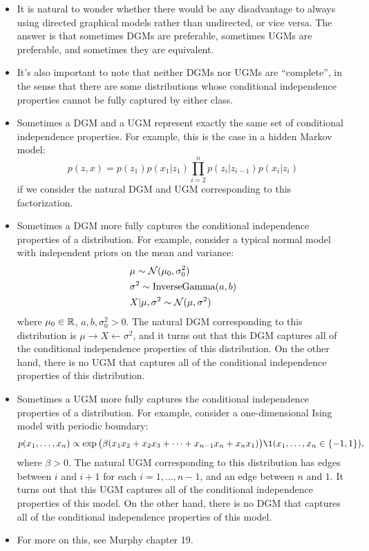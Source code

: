 \documentclass[12pt]{article}
\begin{document}
\begin{itemize}
\item It is natural to wonder whether there would be any disadvantage to always using directed graphical models rather than undirected, or vice versa. The answer is that sometimes DGMs are preferable, sometimes UGMs are preferable, and sometimes they are equivalent. 
\item It's also important to note that neither DGMs nor UGMs are ``complete'', in the sense that there are some distributions whose conditional independence properties cannot be fully captured by either class.
\item Sometimes a DGM and a UGM represent exactly the same set of conditional independence properties. For example, this is the case in a hidden Markov model:
$$ p(z,x) = p(z_1) p(x_1 | z_1) \prod_{i = 2}^n p(z_i | z_{i -1}) p(x_i | z_i) $$
if we consider the natural DGM and UGM corresponding to this factorization.
\item Sometimes a DGM more fully captures the conditional independence properties of a distribution. For example, consider a typical normal model with independent priors on the mean and variance:
\begin{align*}
&\mu \sim\mathcal{N}(\mu_0,\sigma_0^2)\\
& \sigma^2 \sim \mathrm{InverseGamma} (a,b)\\
& X | \mu,\sigma^2 \sim \mathcal{N}(\mu, \sigma^2)
\end{align*}
where $\mu_0 \in \mathbb{R}$, $a,b,\sigma_0^2>0$.
The natural DGM corresponding to this distribution is $\mu\rightarrow X \leftarrow \sigma^2$, and it turns out that this DGM captures all of the conditional independence properties of this distribution. On the other hand, there is no UGM that captures all of the conditional independence properties of this distribution.
\item Sometimes a UGM more fully captures the conditional independence properties of a distribution. For example, consider a one-dimensional Ising model with periodic boundary:
$$ p(x_1,\ldots,x_n) \propto \exp\big(\beta (x_1 x_2 + x_2 x_3+ \cdots + x_{n -1} x_n + x_n x_1) \big)\1(x_1,\ldots,x_n \in \{-1,1 \}), $$
where $\beta>0$.
The natural UGM corresponding to this distribution has edges between $i$ and $i+1$ for each $i=1,\ldots,{n -1}$, and an edge between $n$ and $1$. It turns out that this UGM captures all of the conditional independence properties of this model. On the other hand, there is no DGM that captures all of the conditional independence properties of this model.
\item For more on this, see Murphy chapter 19.
\end{itemize}
\end{document}
